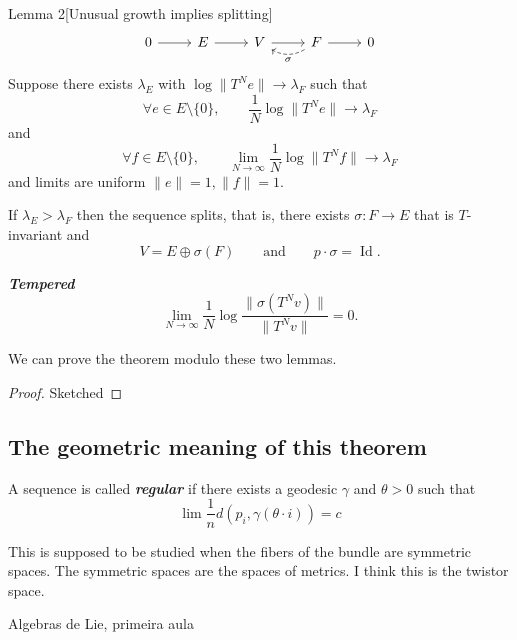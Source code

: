 \begin{thing8}{Lemma 2}[Unusual growth implies splitting]\leavevmode
\[\begin{tikzcd}0\arrow[r]&E\arrow[r]&V\arrow[r]&F\arrow[r]\arrow[l,bend left,dashed,"\sigma"]&0\end{tikzcd}\]
Suppose there exists \(\lambda_E\) with \(\operatorname{log} \|T^N e\|\to \lambda_F\) such that
\[\forall e \in E\setminus\{0\},\qquad \frac{1}{N}\operatorname{log}\|T^Ne\|\to \lambda_F\]
and
\[\forall f \in E\setminus\{0\},\qquad \lim_{N\to \infty} \frac{1}{N}\operatorname{log}\|T^N f\|\to \lambda_F\]
and limits are uniform \(\|e\|=1,\|f\|=1\).

If \(\lambda_E > \lambda_F\) then the sequence splits, that is, there exists \(\sigma:F \to E\) that is  \(T\)-invariant and
\[V=E \oplus \sigma(F)\qquad \text{and} \qquad p\cdot \sigma=\operatorname{Id}.\]
\end{thing8}

\begin{defn}\leavevmode
\textit{\textbf{Tempered}} 
\[\lim_{N\to \infty} \frac{1}{N}\operatorname{log}\frac{\|\sigma(T^N v)\|}{\|T^Nv\|}=0.\]
\end{defn}

We can prove the theorem modulo these two lemmas.

\begin{proof}\leavevmode
Sketched
\end{proof}

\subsection{The geometric meaning of this theorem}

\begin{defn}\leavevmode
A sequence is called \textit{\textbf{regular}} if there exists a geodesic \(\gamma\) and \(\theta>0\) such that
\[\lim \frac{1}{n}d(p_i, \gamma(\theta\cdot i))=c \]
\end{defn}

\begin{remark}\leavevmode
This is supposed to be studied when the fibers of the bundle are symmetric spaces. The symmetric spaces are the spaces of metrics. I think this is the twistor space.
\end{remark}


\clearpage{}
{\Huge Algebras de Lie, primeira aula}


